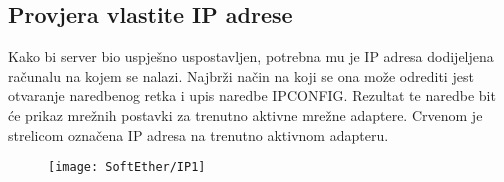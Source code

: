 \subsection*{Provjera vlastite IP adrese}
\hspace{0.5cm}
Kako bi server bio uspješno uspostavljen, potrebna mu je IP adresa dodijeljena računalu na kojem se nalazi. Najbrži način na koji se ona može odrediti jest otvaranje naredbenog retka i upis naredbe IPCONFIG. Rezultat te naredbe bit će prikaz mrežnih postavki za trenutno aktivne mrežne adaptere.
Crvenom je strelicom označena IP adresa na trenutno aktivnom adapteru.
\begin{figure}[h!]
     \centering
     \texttt{[image: SoftEther/IP1]}
\end{figure}
\FloatBarrier

